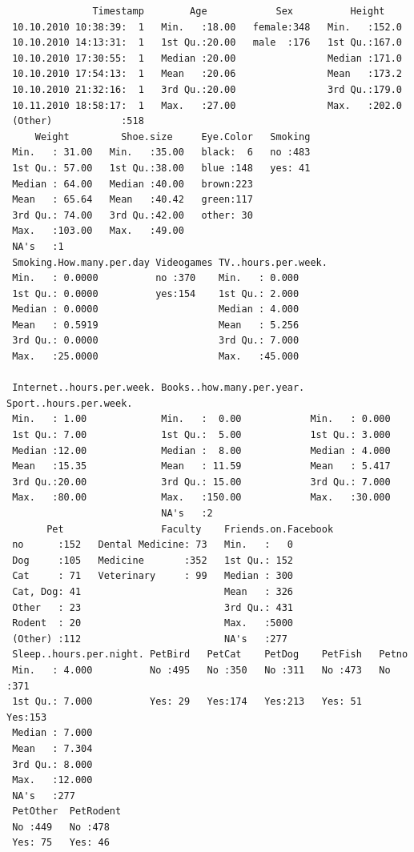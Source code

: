 \documentclass[
]{article}
\begin{document}
\begin{verbatim}
               Timestamp        Age            Sex          Height     
 10.10.2010 10:38:39:  1   Min.   :18.00   female:348   Min.   :152.0  
 10.10.2010 14:13:31:  1   1st Qu.:20.00   male  :176   1st Qu.:167.0  
 10.10.2010 17:30:55:  1   Median :20.00                Median :171.0  
 10.10.2010 17:54:13:  1   Mean   :20.06                Mean   :173.2  
 10.10.2010 21:32:16:  1   3rd Qu.:20.00                3rd Qu.:179.0  
 10.11.2010 18:58:17:  1   Max.   :27.00                Max.   :202.0  
 (Other)            :518                                               
     Weight         Shoe.size     Eye.Color   Smoking  
 Min.   : 31.00   Min.   :35.00   black:  6   no :483  
 1st Qu.: 57.00   1st Qu.:38.00   blue :148   yes: 41  
 Median : 64.00   Median :40.00   brown:223            
 Mean   : 65.64   Mean   :40.42   green:117            
 3rd Qu.: 74.00   3rd Qu.:42.00   other: 30            
 Max.   :103.00   Max.   :49.00                        
 NA's   :1                                             
 Smoking.How.many.per.day Videogames TV..hours.per.week.
 Min.   : 0.0000          no :370    Min.   : 0.000     
 1st Qu.: 0.0000          yes:154    1st Qu.: 2.000     
 Median : 0.0000                     Median : 4.000     
 Mean   : 0.5919                     Mean   : 5.256     
 3rd Qu.: 0.0000                     3rd Qu.: 7.000     
 Max.   :25.0000                     Max.   :45.000     
                                                        
 Internet..hours.per.week. Books..how.many.per.year. Sport..hours.per.week.
 Min.   : 1.00             Min.   :  0.00            Min.   : 0.000        
 1st Qu.: 7.00             1st Qu.:  5.00            1st Qu.: 3.000        
 Median :12.00             Median :  8.00            Median : 4.000        
 Mean   :15.35             Mean   : 11.59            Mean   : 5.417        
 3rd Qu.:20.00             3rd Qu.: 15.00            3rd Qu.: 7.000        
 Max.   :80.00             Max.   :150.00            Max.   :30.000        
                           NA's   :2                                       
       Pet                 Faculty    Friends.on.Facebook
 no      :152   Dental Medicine: 73   Min.   :   0       
 Dog     :105   Medicine       :352   1st Qu.: 152       
 Cat     : 71   Veterinary     : 99   Median : 300       
 Cat, Dog: 41                         Mean   : 326       
 Other   : 23                         3rd Qu.: 431       
 Rodent  : 20                         Max.   :5000       
 (Other) :112                         NA's   :277        
 Sleep..hours.per.night. PetBird   PetCat    PetDog    PetFish   Petno    
 Min.   : 4.000          No :495   No :350   No :311   No :473   No :371  
 1st Qu.: 7.000          Yes: 29   Yes:174   Yes:213   Yes: 51   Yes:153  
 Median : 7.000                                                           
 Mean   : 7.304                                                           
 3rd Qu.: 8.000                                                           
 Max.   :12.000                                                           
 NA's   :277                                                              
 PetOther  PetRodent
 No :449   No :478  
 Yes: 75   Yes: 46  
                    

\end{verbatim}
\end{document}
